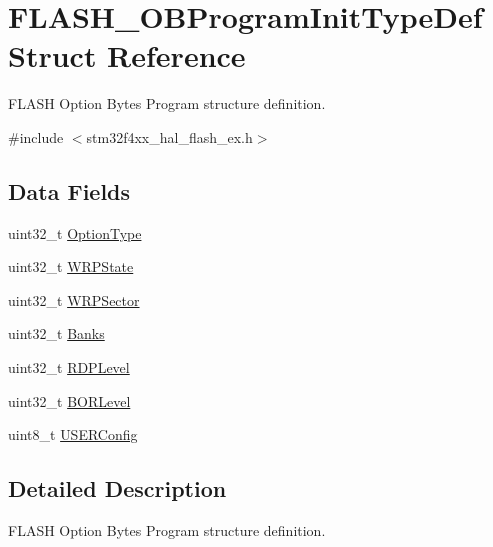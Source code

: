\hypertarget{struct_f_l_a_s_h___o_b_program_init_type_def}{}\section{F\+L\+A\+S\+H\+\_\+\+O\+B\+Program\+Init\+Type\+Def Struct Reference}
\label{struct_f_l_a_s_h___o_b_program_init_type_def}


F\+L\+A\+SH Option Bytes Program structure definition.  




{\ttfamily \#include $<$stm32f4xx\+\_\+hal\+\_\+flash\+\_\+ex.\+h$>$}

\subsection*{Data Fields}
\begin{DoxyCompactItemize}
\item 
uint32\+\_\+t \mbox{\hyperlink{struct_f_l_a_s_h___o_b_program_init_type_def_ac5941efaeb6bd9e3c0852613f990ebd8}{Option\+Type}}
\item 
uint32\+\_\+t \mbox{\hyperlink{struct_f_l_a_s_h___o_b_program_init_type_def_ab5ab320199482e9eb21dc8460501dea5}{W\+R\+P\+State}}
\item 
uint32\+\_\+t \mbox{\hyperlink{struct_f_l_a_s_h___o_b_program_init_type_def_a549b7149fc7cec7fa1235aa040b9d498}{W\+R\+P\+Sector}}
\item 
uint32\+\_\+t \mbox{\hyperlink{struct_f_l_a_s_h___o_b_program_init_type_def_aa07868a5b012861c6111322c3dccdbec}{Banks}}
\item 
uint32\+\_\+t \mbox{\hyperlink{struct_f_l_a_s_h___o_b_program_init_type_def_a671880a1dafb7b92e0e2b65593407c12}{R\+D\+P\+Level}}
\item 
uint32\+\_\+t \mbox{\hyperlink{struct_f_l_a_s_h___o_b_program_init_type_def_af4bc744e01810b8cdef4b7c8c8e6009c}{B\+O\+R\+Level}}
\item 
uint8\+\_\+t \mbox{\hyperlink{struct_f_l_a_s_h___o_b_program_init_type_def_ac4ab84c90f7a878b0b39ec1f3dda8ded}{U\+S\+E\+R\+Config}}
\end{DoxyCompactItemize}


\subsection{Detailed Description}
F\+L\+A\+SH Option Bytes Program structure definition. 

